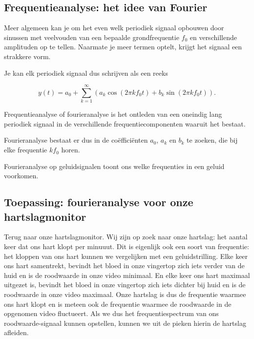 \subsection{Frequentieanalyse: het idee van Fourier}

Meer algemeen kan je om het even welk periodiek signaal opbouwen door sinussen met veelvouden van een bepaalde grondfrequentie $f_0$ en verschillende amplituden op te tellen. Naarmate je meer termen optelt, krijgt het signaal een strakkere vorm.

Je kan elk periodiek signaal dus schrijven als een reeks

\begin{equation*}
y(t) = a_0 + \sum_{k=1}^{\infty} (a_k \cos(2 \pi k f_0 t) + b_k \sin(2 \pi k f_0 t)).
\end{equation*}

Frequentieanalyse of fourieranalyse is het ontleden van een oneindig lang periodiek signaal in de verschillende frequentiecomponenten waaruit het bestaat. 

Fourieranalyse bestaat er dus in de co\"effici\"enten $a_0$, $a_k$ en $b_k$ te zoeken, die bij elke frequentie $k f_0$ horen.


Fourieranalyse op geluidsignalen toont ons welke frequenties in een geluid voorkomen.

\subsection{Toepassing: fourieranalyse voor onze hartslagmonitor}

Terug naar onze hartslagmonitor. Wij zijn op zoek naar onze hartslag: het aantal keer dat ons hart klopt per minuuut. Dit is eigenlijk ook een soort van frequentie: het kloppen van ons hart kunnen we vergelijken met een geluidstrilling. Elke keer ons hart samentrekt, bevindt het bloed in onze vingertop zich iets verder van de huid en is de roodwaarde in onze video minimaal. En elke keer ons hart maximaal uitgezet is, bevindt het bloed in onze vingertop zich iets dichter bij huid en is de roodwaarde in onze video maximaal. Onze hartslag is dus de frequentie waarmee ons hart klopt en is meteen ook de frequentie waarmee de roodwaarde in de opgenomen video fluctueert. Als we dus het frequentiespectrum van ons roodwaarde-signaal kunnen opstellen, kunnen we uit de pieken hierin de hartslag afleiden.


